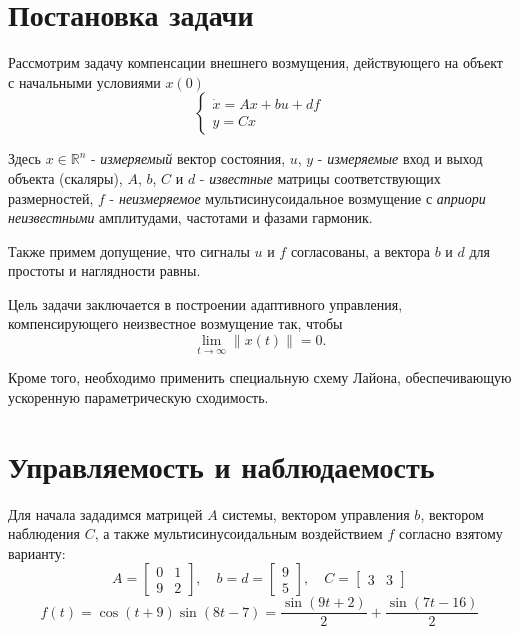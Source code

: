 \documentclass[a4paper,hidelinks,14pt]{extarticle}
\begin{document}
	\section{Постановка задачи}
	Рассмотрим задачу компенсации внешнего возмущения, действующего на объект с начальными условиями $x(0)$
	\begin{equation}
		\begin{cases}
			\dot{x} = Ax + bu + df \\
			y = Cx
		\end{cases}	
	\end{equation}

	Здесь $x \in \mathbb{R}^n$ - \textit{измеряемый} вектор состояния, $u$, $y$ - \textit{измеряемые} вход и выход объекта (скаляры), $A$, $b$, $C$ и $d$ - \textit{известные} матрицы соответствующих размерностей, $f$ - \textit{неизмеряемое} мультисинусоидальное возмущение с \textit{априори неизвестными} амплитудами, частотами и фазами гармоник.
	
	Также примем допущение, что сигналы $u$ и $f$ согласованы, а вектора $b$ и $d$ для простоты и наглядности равны.

	Цель задачи заключается в построении адаптивного управления, компенсирующего неизвестное возмущение так, чтобы
	\begin{equation}
		\lim_{t \to \infty} \|x(t)\| = 0. \label{3}
	\end{equation}

	Кроме того, необходимо применить специальную схему Лайона, обеспечивающую ускоренную параметрическую сходимость.

	\section{Управляемость и наблюдаемость}
	Для начала зададимся матрицей $A$ системы, вектором управления $b$, вектором наблюдения $C$, а также мультисинусоидальным воздействием $f$ согласно взятому варианту:
	\[
		A = \begin{bmatrix}
			0 & 1 \\
			9 & 2
		\end{bmatrix}, \quad
		b = d = \begin{bmatrix}
			9 \\
			5
		\end{bmatrix}, \quad
		C = \begin{bmatrix}
			3 & 3
		\end{bmatrix}
	\]
	\[
		f(t) = \cos(t + 9)\sin(8t-7) = \frac{\sin(9t + 2)}{2} + \frac{\sin(7t - 16)}{2}
	\]
\end{document}
